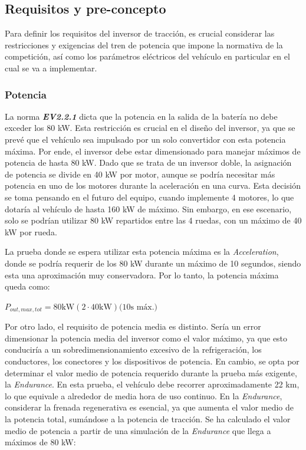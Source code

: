 \subsection{Requisitos y pre-concepto}

Para definir los requisitos del inversor de tracción, es crucial considerar las restricciones y exigencias del tren de potencia que impone la normativa de la competición, así como los parámetros eléctricos del vehículo en particular en el cual se va a implementar.

\subsubsection{Potencia}
La norma \textit{\textbf{EV2.2.1}} dicta que la potencia en la salida de la batería no debe exceder los 80 kW. Esta restricción es crucial en el diseño del inversor, ya que se prevé que el vehículo sea impulsado por un solo convertidor con esta potencia máxima. Por ende, el inversor debe estar dimensionado para manejar máximos de potencia de hasta 80 kW. Dado que se trata de un inversor doble, la asignación de potencia se divide en 40 kW por motor, aunque se podría necesitar más potencia en uno de los motores durante la aceleración en una curva. Esta decisión se toma pensando en el futuro del equipo, cuando implemente 4 motores, lo que dotaría al vehículo de hasta 160 kW de máximo. Sin embargo, en ese escenario, solo se podrían utilizar 80 kW repartidos entre las 4 ruedas, con un máximo de 40 kW por rueda.

La prueba donde se espera utilizar esta potencia máxima es la \textit{Acceleration}, donde se podría requerir de los 80 kW durante un máximo de 10 segundos, siendo esta una aproximación muy conservadora. Por lo tanto, la potencia máxima queda como:

\(P_{out, max, tot} = 80 \text{kW} (2 \cdot 40 \text{kW}) \text{(10s máx.)}\)


Por otro lado, el requisito de potencia media es distinto. Sería un error dimensionar la potencia media del inversor como el valor máximo, ya que esto conduciría a un sobredimensionamiento excesivo de la refrigeración, los conductores, los conectores y los dispositivos de potencia. En cambio, se opta por determinar el valor medio de potencia requerido durante la prueba más exigente, la \textit{Endurance}. En esta prueba, el vehículo debe recorrer aproximadamente 22 km, lo que equivale a alrededor de media hora de uso continuo. En la \textit{Endurance}, considerar la frenada regenerativa es esencial, ya que aumenta el valor medio de la potencia total, sumándose a la potencia de tracción. Se ha calculado el valor medio de potencia a partir de una simulación de la \textit{Endurance} que llega a máximos de 80 kW:

